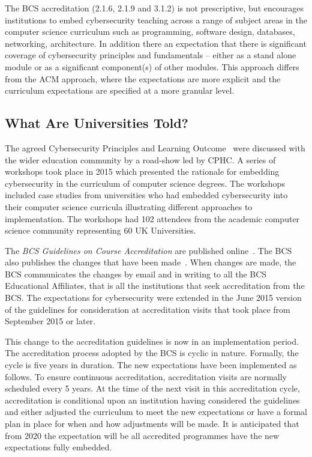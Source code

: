 \documentclass[conference]{IEEEtran}
\begin{document}
The BCS accreditation (2.1.6, 2.1.9 and 3.1.2) is not prescriptive, but encourages institutions to embed cybersecurity teaching across a range of subject areas in the computer science curriculum such as programming, software design, databases, networking, architecture. In addition there an expectation that there is significant coverage of cybersecurity principles and fundamentals -- either as a stand alone module or as a significant component(s) of other modules. This approach differs from the ACM approach, where the expectations are more explicit and the curriculum expectations are specified at a more granular level.


\subsection{What Are Universities Told?}
The agreed Cybersecurity Principles and Learning Outcome~\cite{CPHCISC2} were discussed with the wider education community by a road-show led by CPHC. A series of workshops took place in 2015 which presented the rationale for embedding cybersecurity in the curriculum of computer science degrees. The workshops included case studies from universities who had embedded cybersecurity into their computer science curricula illustrating different approaches to implementation. The workshops had 102 attendees from the academic computer science community representing 60 UK Universities. 

The {\emph{BCS Guidelines on Course Accreditation}} are published online~\cite{BCS2018a}. The BCS also publishes the changes that have been made~\cite{BCS2018b}. When changes are made, the BCS communicates the changes by email and in writing to all the BCS Educational Affiliates, that is all the institutions that seek accreditation from the BCS. The expectations for cybersecurity were extended in the June 2015 version of the guidelines for consideration at accreditation visits that took place from September 2015 or later.

This change to the accreditation guidelines is now in an implementation period. The accreditation process adopted by the BCS is cyclic in nature. Formally, the cycle is five years in duration. The new expectations have been implemented as follows. To ensure continuous accreditation, accreditation visits are normally scheduled every 5 years. At the time of the next visit in this accreditation cycle, accreditation is conditional upon an institution having considered the guidelines and either adjusted the curriculum to meet the new expectations or have a formal plan in place for when and how adjustments will be made.  It is anticipated that from 2020 the expectation will be all accredited programmes have the new expectations fully embedded.
\end{document}
